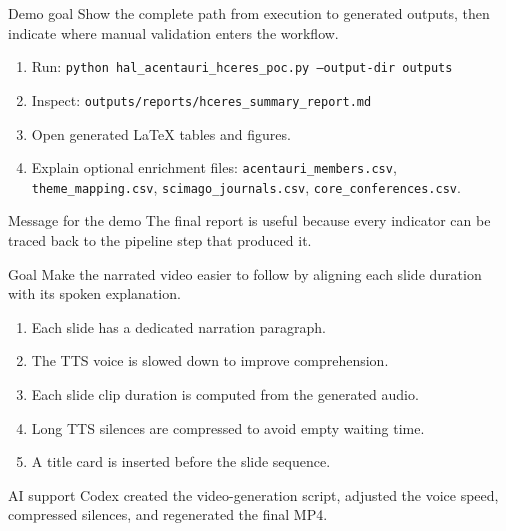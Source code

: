 \begin{frame}[t]

  \begin{block}{Demo goal}
    Show the complete path from execution to generated outputs, then indicate where manual validation enters the workflow.
  \end{block}

  \begin{enumerate}
    \item Run: \texttt{python hal\_acentauri\_hceres\_poc.py --output-dir outputs}
    \item Inspect: \texttt{outputs/reports/hceres\_summary\_report.md}
    \item Open generated LaTeX tables and figures.
    \item Explain optional enrichment files:
      \texttt{acentauri\_members.csv}, \texttt{theme\_mapping.csv},
      \texttt{scimago\_journals.csv}, \texttt{core\_conferences.csv}.
  \end{enumerate}

  \begin{block}{Message for the demo}
    The final report is useful because every indicator can be traced back to the pipeline step that produced it.
  \end{block}
\end{frame}

\begin{frame}[t]

  \begin{block}{Goal}
    Make the narrated video easier to follow by aligning each slide duration with its spoken explanation.
  \end{block}

  \begin{enumerate}
    \item Each slide has a dedicated narration paragraph.
    \item The TTS voice is slowed down to improve comprehension.
    \item Each slide clip duration is computed from the generated audio.
    \item Long TTS silences are compressed to avoid empty waiting time.
    \item A title card is inserted before the slide sequence.
  \end{enumerate}

  \begin{block}{AI support}
    Codex created the video-generation script, adjusted the voice speed, compressed silences, and regenerated the final MP4.
  \end{block}
\end{frame}

